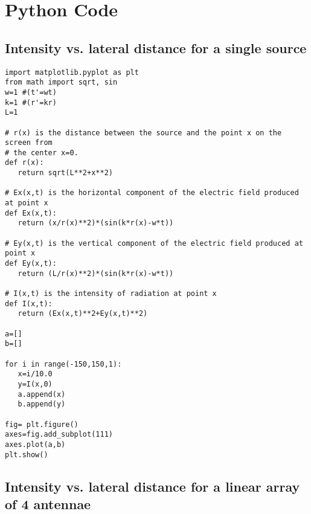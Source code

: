 \chapter{Python Code}

\section{Intensity vs. lateral distance for a single source}\label{code:single}

\begin{Verbatim}[fontsize=\small,baselinestretch=0.9]
import matplotlib.pyplot as plt
from math import sqrt, sin
w=1 #(t'=wt)
k=1 #(r'=kr)
L=1

# r(x) is the distance between the source and the point x on the screen from 
# the center x=0.
def r(x):
   return sqrt(L**2+x**2)

# Ex(x,t) is the horizontal component of the electric field produced at point x 
def Ex(x,t):
   return (x/r(x)**2)*(sin(k*r(x)-w*t))

# Ey(x,t) is the vertical component of the electric field produced at point x 
def Ey(x,t):
   return (L/r(x)**2)*(sin(k*r(x)-w*t))

# I(x,t) is the intensity of radiation at point x
def I(x,t):
   return (Ex(x,t)**2+Ey(x,t)**2)

a=[]
b=[]

for i in range(-150,150,1):
   x=i/10.0
   y=I(x,0)
   a.append(x)
   b.append(y)

fig= plt.figure()
axes=fig.add_subplot(111)
axes.plot(a,b)
plt.show()
\end{Verbatim}


\section{Intensity vs. lateral distance for a linear array of 4 antennae}\label{code:four}

